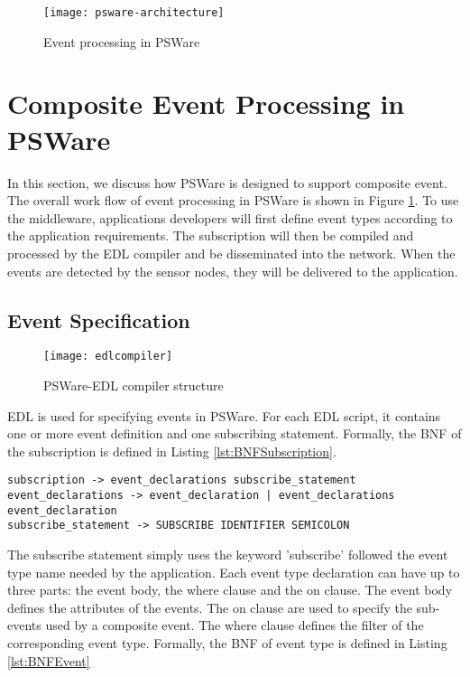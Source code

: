 \begin{figure}
\centering
\texttt{[image: psware-architecture]}
\caption{Event processing in PSWare}
\label{fig:psware-architecture}
\end{figure}

\section{Composite Event Processing in PSWare}
\label{sec:design}
In this section, we discuss how PSWare is designed to support composite event. The overall work flow of event processing in PSWare is shown in Figure \ref{fig:psware-architecture}. To use the middleware, applications developers will first define event types according to the application requirements. The subscription will then be compiled and processed by the EDL compiler and be disseminated into the network. When the events are detected by the sensor nodes, they will be delivered to the application.

\subsection{Event Specification}
\begin{figure}
\centering
\texttt{[image: edlcompiler]}
\caption{PSWare-EDL compiler structure}
\label{fig:edlcompiler}
\end{figure}

EDL is used for specifying events in PSWare. For each EDL script, it contains one or more event definition and one subscribing statement. Formally, the BNF of the subscription is defined in Listing \ref{lst:BNFSubscription}.

\begin{lstlisting}[caption=BNF (simplified) of subscription, label=lst:BNFSubscription]
subscription -> event_declarations subscribe_statement
event_declarations -> event_declaration | event_declarations event_declaration
subscribe_statement -> SUBSCRIBE IDENTIFIER SEMICOLON
\end{lstlisting}

The subscribe statement simply uses the keyword 'subscribe' followed the event type name needed by the application. Each event type declaration can have up to three parts: the event body, the where clause and the on clause. The event body defines the attributes of the events. The on clause are used to specify the sub-events used by a composite event. The where clause defines the filter of the corresponding event type. Formally, the BNF of event type is defined in Listing \ref{lst:BNFEvent}

